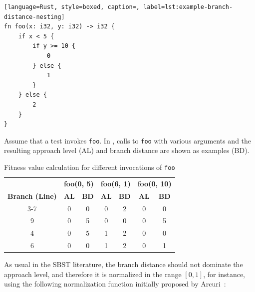 \documentclass[paper=a4,%
  twoside,%
  BCOR4mm,%
  abstract=true,%
  toc=bibliography,%
  chapterprefix=true,%
  toc=bibliographynumbered,%
  open=right,%
  english,%
  pagesize=pdftex]{scrreprt}
\begin{document}
\begin{lstlisting}[language=Rust, style=boxed, caption=, label=lst:example-branch-distance-nesting]
fn foo(x: i32, y: i32) -> i32 {
    if x < 5 {
        if y >= 10 {
            0
        } else {
            1
        }
    } else {
        2
    }
}
\end{lstlisting}

Assume that a test invokes \lstinline{foo}. In , calls to \lstinline{foo} with various arguments and the resulting approach level (AL) and branch distance are shown as examples (BD).
\begin{table}[h!]
\centering
\begin{tabular}{c|cc|cc|cc}
\hline
& \multicolumn{2}{c|}{\textbf{foo(0, 5)}}                     & \multicolumn{2}{c|}{\textbf{foo(6, 1)}}                      & \multicolumn{2}{c}{\textbf{foo(0, 10)}}                     \\
\cline{2-7}
\textbf{Branch (Line)} & \textbf{AL} & \textbf{BD} & \textbf{AL} & \textbf{BD} & \textbf{AL} & \textbf{BD} \\
\hline
3-7                    & 0                       & 0                        & 0                       & 2                        & 0                       & 0                        \\
9                      & 0                       & 5                        & 0                       & 0                        & 0                       & 5                        \\
4                      & 0                       & 5                        & 1                       & 2                        & 0                       & 0                        \\
6                      & 0                       & 0                        & 1                       & 2                        & 0                       & 1 \\ \hline
\end{tabular}
\caption{Fitness value calculation for different invocations of \lstinline{foo}}
\label{tab:example-fitness-calculation}
\end{table}

As usual in the \ac{SBST} literature, the branch distance should not dominate the approach level, and therefore it is normalized in the range $[0, 1]$, for instance, using the following normalization function initially proposed by Arcuri~\cite{Arcuri_2011}:
\end{document}
